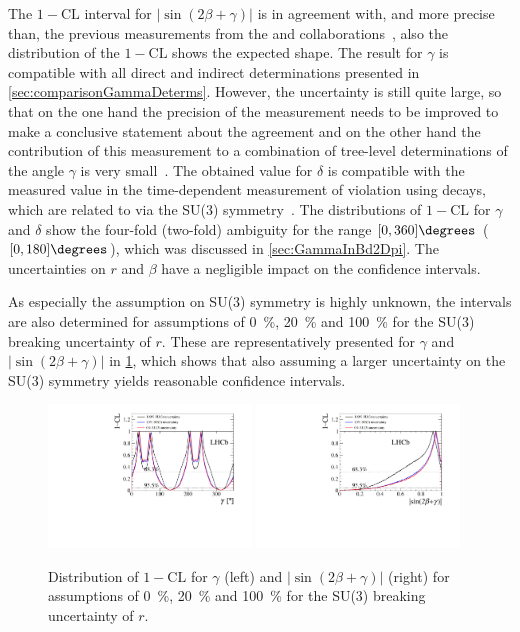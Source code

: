 The $1-\text{CL}$ interval for $\left|\sin\!\left(2\beta+\gamma\right)\right|$ is in agreement with, and more precise than, the previous measurements from the \belle and \babar collaborations~\cite{Ronga:2006hv,Aubert:2006tw}, also the distribution of the $1-\text{CL}$ shows the expected shape.
The result for $\gamma$ is compatible with all direct and indirect determinations presented in \cref{sec:comparisonGammaDeterms}.
However, the uncertainty is still quite large, so that on the one hand the precision of the measurement needs to be improved to make a conclusive statement about the agreement and on the other hand the contribution of this measurement to a combination of tree-level determinations of the angle $\gamma$ is very small~\cite{GammCombo}.
The obtained value for $\delta$ is compatible with the measured value in the time-dependent measurement of \CP violation using \BsToDsK decays, which are related to \BdToDpi via the SU(3) symmetry~\cite{Fleischer:2003yb}.
The distributions of $1-\text{CL}$ for $\gamma$ and $\delta$ show the four-fold (two-fold) ambiguity for the range $[0, 360]\degrees$ ($[0, 180]\degrees$), which was discussed in \cref{sec:GammaInBd2Dpi}.
The uncertainties on $r$ and $\beta$ have a negligible impact on the confidence intervals.

As especially the assumption on SU(3) symmetry is highly unknown, the intervals are also determined for assumptions of \SI{0}{\percent}, \SI{20}{\percent} and \SI{100}{\percent} for the SU(3) breaking uncertainty of $r$.
These are representatively presented for $\gamma$ and $\left|\sin\!\left(2\beta+\gamma\right)\right|$ in \cref{fig:SU3Scan}, which shows that also assuming a larger uncertainty on the SU(3) symmetry yields reasonable confidence intervals.
\begin{figure}[tbp]
    \centering
    \includegraphics[width=0.48\textwidth]{11Result/figs/su3_scan_bd2dpi_g.pdf}
    \includegraphics[width=0.48\textwidth]{11Result/figs/su3_scan_sin2b_plus_gamma.pdf}
    \caption{Distribution of $1-\text{CL}$ for $\gamma$ (left) and $\left|\sin\!\left(2\beta+\gamma\right)\right|$ (right) for assumptions of \SI{0}{\percent}, \SI{20}{\percent} and \SI{100}{\percent} for the SU(3) breaking uncertainty of $r$.}
    \label{fig:SU3Scan}
\end{figure}
